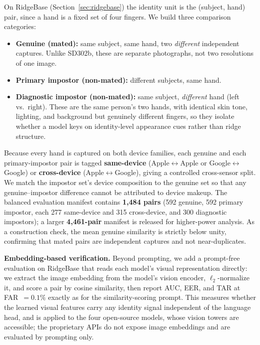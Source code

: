 \documentclass[journal]{IEEEtran}
\begin{document}
On RidgeBase (Section~\ref{sec:ridgebase}) the identity unit is the
(subject, hand) pair, since a hand is a fixed set of four fingers. We build
three comparison categories:
\begin{itemize}
  \item \textbf{Genuine (mated):} same subject, same hand, two \emph{different}
        independent captures. Unlike SD302b, these are separate photographs,
        not two resolutions of one image.
  \item \textbf{Primary impostor (non-mated):} different subjects, same hand.
  \item \textbf{Diagnostic impostor (non-mated):} same subject, \emph{different}
        hand (left vs.\ right). These are the same person's two hands, with identical
        skin tone, lighting, and background but genuinely different fingers, so
        they isolate whether a model keys on identity-level appearance cues
        rather than ridge structure.
\end{itemize}
Because every hand is captured on both device families, each genuine and each
primary-impostor pair is tagged \textbf{same-device} (Apple$\leftrightarrow$Apple
or Google$\leftrightarrow$Google) or \textbf{cross-device}
(Apple$\leftrightarrow$Google), giving a controlled cross-sensor split. We match
the impostor set's device composition to the genuine set so that any
genuine--impostor difference cannot be attributed to device makeup. The balanced
evaluation manifest contains \textbf{1{,}484 pairs} (592 genuine, 592 primary
impostor, each 277 same-device and 315 cross-device, and 300 diagnostic
impostors); a larger \textbf{4{,}461-pair} manifest is released for
higher-power analysis. As a construction check, the mean genuine similarity is
strictly below unity, confirming that mated pairs are independent captures and
not near-duplicates.

\textbf{Embedding-based verification.}
Beyond prompting, we add a prompt-free evaluation on RidgeBase that reads each
model's visual representation directly: we extract the image embedding from the
model's vision encoder, $\ell_2$-normalize it, and score a pair by cosine
similarity, then report AUC, EER, and TAR at FAR~$=0.1\%$ exactly as for the
similarity-scoring prompt. This measures whether the learned visual features
carry any identity signal independent of the language head, and is applied to
the four open-source models, whose vision towers are accessible; the
proprietary APIs do not expose image embeddings and are evaluated by prompting
only.
\end{document}
